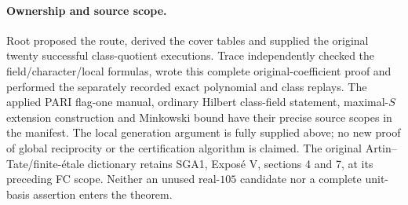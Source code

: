 \paragraph{Ownership and source scope.}
Root proposed the route, derived the cover tables and supplied
the original twenty successful class-quotient executions.
Trace independently checked the field/character/local formulas,
wrote this complete original-coefficient proof and performed
the separately recorded exact polynomial and class replays.
The applied PARI flag-one manual, ordinary Hilbert class-field
statement, maximal-$S$ extension construction and Minkowski
bound have their precise source scopes in the manifest.
The local generation argument is fully supplied above; no
new proof of global reciprocity or the certification algorithm
is claimed. The original Artin--Tate/finite-\'etale dictionary
retains SGA1, Expos\'e V, sections 4 and 7, at its preceding
FC scope. Neither an unused real-$105$ candidate nor a complete
unit-basis assertion enters the theorem.
